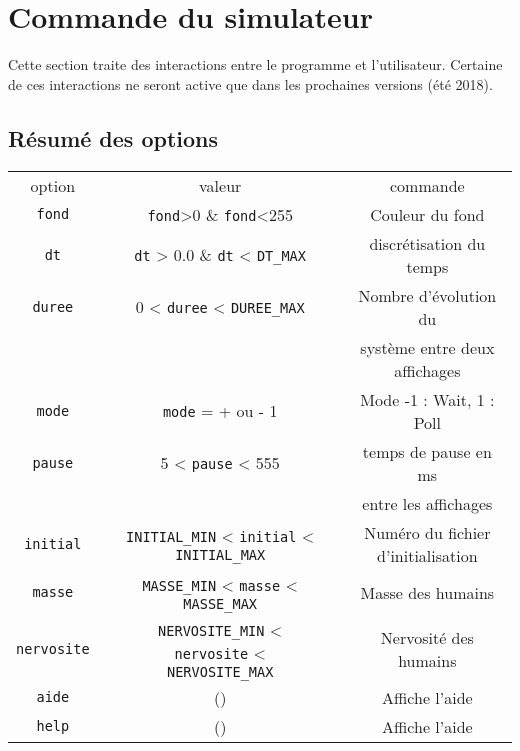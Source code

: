 \section{Commande du simulateur}
%
Cette section traite des interactions entre le programme et l'utilisateur. Certaine de ces interactions ne seront active que dans les prochaines versions (été 2018).
%
\subsection{Résumé des options}
\begin{center}
\begin{tabular}{ccccc}
option & & valeur &  & commande \\
\texttt{fond} &  & \texttt{fond}>0 \& \texttt{fond}<255 &  & Couleur du fond \\
\texttt{dt} &  & \texttt{dt} > 0.0 \& \texttt{dt} < \texttt{DT\_MAX} &  & discrétisation du temps \\
\texttt{duree} &  & 0 < \texttt{duree} < \texttt{DUREE\_MAX} &  & Nombre d'évolution du \\
 &  &  &  & système entre deux affichages \\
\texttt{mode} &  & \texttt{mode} = + ou - 1 &  & Mode -1 : Wait, 1 : Poll \\
\texttt{pause} &  & 5 < \texttt{pause} < 555 &  & temps de pause en ms \\
 &  &  &  & entre les affichages \\
\texttt{initial} &  & \texttt{INITIAL\_MIN} < \texttt{initial} < \texttt{INITIAL\_MAX} &  & Numéro du fichier d'initialisation \\
\texttt{masse} &  & \texttt{MASSE\_MIN} < \texttt{masse} < \texttt{MASSE\_MAX} &  & Masse des humains \\
\texttt{nervosite} &  & \texttt{NERVOSITE\_MIN} < \texttt{nervosite} < \texttt{NERVOSITE\_MAX} &  & Nervosité des humains \\%
\texttt{aide} &  & () &  & Affiche l'aide \\
\texttt{help} &  & () &  & Affiche l'aide \\
\end{tabular}
\end{center}
